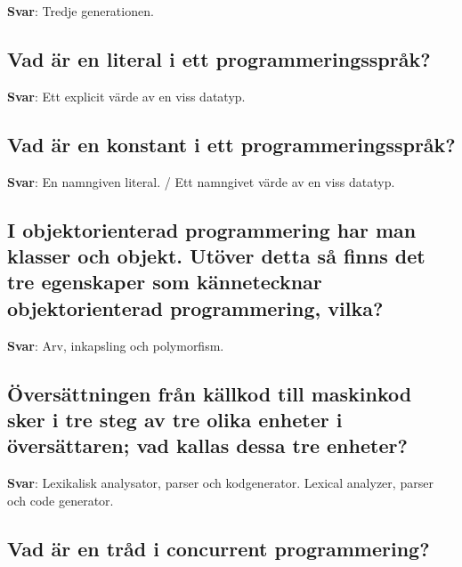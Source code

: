 \documentclass[a4paper,11pt,oneside]{article}
\begin{document}
\begin{sloppypar}
\label{q:210:sa:sv:True}

\textbf{Svar}: Tredje generationen.



\subsection{Vad \"ar en literal i ett programmeringsspr\r{a}k?}

\label{q:211:sa:sv:True}

\textbf{Svar}: Ett explicit v\"arde av en viss datatyp.



\subsection{Vad \"ar en konstant i ett programmeringsspr\r{a}k?}

\label{q:212:sa:sv:True}

\textbf{Svar}: En namngiven literal. / Ett namngivet v\"arde av en viss datatyp.



\subsection{I objektorienterad programmering har man klasser och objekt. Ut\"over detta s\r{a} finns det tre egenskaper som k\"annetecknar objektorienterad programmering, vilka?}

\label{q:213:sa:sv:True}

\textbf{Svar}: Arv, inkapsling och polymorfism.



\subsection{\"Overs\"attningen fr\r{a}n k\"allkod till maskinkod sker i tre steg av tre olika enheter i \"overs\"attaren; vad kallas dessa tre enheter?}

\label{q:214:sa:sv:True}

\textbf{Svar}: Lexikalisk analysator, parser och kodgenerator. Lexical analyzer, parser och code generator.



\subsection{Vad \"ar en tr\r{a}d i concurrent programmering?}


\end{sloppypar}
\end{document}
